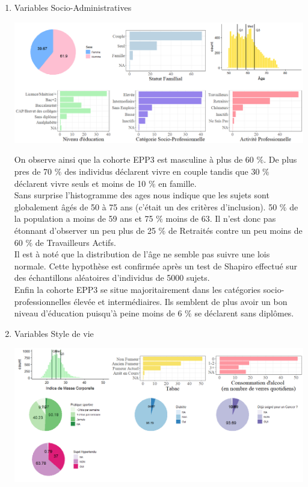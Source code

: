 \documentclass{book}
\begin{document}
\begin{enumerate}
\item Variables Socio-Administratives
\begin{center}
\includegraphics[scale=.4]{tab_var_socio_ad.png}
\end{center}
On observe ainsi que la cohorte EPP3 est masculine à plus de 60 $\%$. De plus pres de 70 $\%$ des individus déclarent vivre en couple tandis que 30 $\%$  déclarent vivre seuls et moins de 10 $\%$ en famille.\\

\noindent
Sans surprise l'histogramme des ages nous indique que les sujets sont globalement âgés de 50 à 75 ans (c'était un des critères d'inclusion). 50 $\%$ de la population a moins de 59 ans et 75 $\%$ moins de 63. Il n'est donc pas étonnant d'observer un peu plus de 25 $\%$ de Retraités contre un peu moins de 60 $\%$ de Travailleurs Actifs.\\

\noindent
Il est à noté que la distribution de l'âge ne semble pas suivre une lois normale. Cette hypothèse est confirmée après un test de Shapiro effectué sur des échantillons aléatoires d'individus de 5000 sujets.\\

Enfin la cohorte EPP3 se situe majoritairement dans les catégories socio-professionnelles élevée et intermédiaires.
Ils semblent de plus avoir un bon niveau d'éducation puisqu'à peine moins de 6 $\%$ se déclarent sans diplômes.\\

\bigskip
\item Variables Style de vie
\begin{center}
\includegraphics[scale=.45]{tab_var_sante_phys.png}
\end{center}


\end{enumerate}
\end{document}
